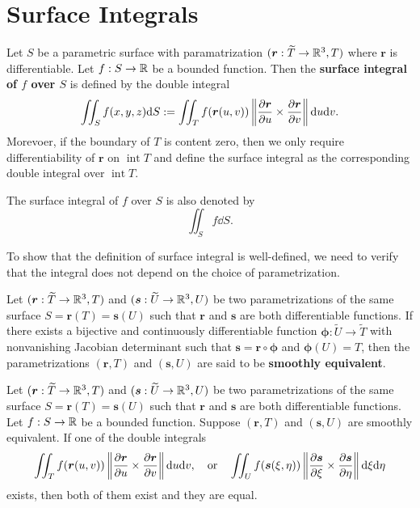 \section{Surface Integrals}
\begin{definitionenv}
    Let $S$ be a parametric surface with paramatrization $(\bm r: \widetilde T\to \mathbb{R}^3, T)$ where $\bm r$ is differentiable. Let $f: S\to \mathbb{R}$ be a bounded function. Then the \textbf{surface integral of $f$ over $S$} is defined by the double integral
    $$ \iint_S f(x,y,z) \dd S := \iint_T f(\bm r(u,v)) \left\| \pdv{\bm r}{u}\times \pdv{\bm r}{v} \right\| \dd u \dd v. $$
    Morevoer, if the boundary of $T$ is content zero, then we only require differentiability of $\bm r$ on $\operatorname{int} T$ and define the surface integral as the corresponding double integral over $\operatorname{int} T$.
\end{definitionenv}
\begin{notationenv}
    The surface integral of $f$ over $S$ is also denoted by
    $$ \iint_S f \dd S. $$
\end{notationenv}
\begin{remarkenv}
    To show that the definition of surface integral is well-defined, we need to verify that the integral does not depend on the choice of parametrization.
\end{remarkenv}
\begin{definitionenv}
    Let $(\bm r: \widetilde T\to \mathbb{R}^3, T)$ and $(\bm s: \widetilde U\to \mathbb{R}^3, U)$ be two parametrizations of the same surface $S = \bm r(T) = \bm s(U)$ such that $\bm r$ and $\bm s$ are both differentiable functions. If there exists a bijective and continuously differentiable function $\bm \phi: \widetilde U\to \widetilde T$ with nonvanishing Jacobian determinant such that $\bm s = \bm r\circ \bm \phi$ and $\bm \phi(U) = T$, then the parametrizations $(\bm r, T)$ and $(\bm s, U)$ are said to be \textbf{smoothly equivalent}.
\end{definitionenv}
\begin{theoremenv}
    Let $(\bm r: \widetilde T\to \mathbb{R}^3, T)$ and $(\bm s: \widetilde U\to \mathbb{R}^3, U)$ be two parametrizations of the same surface $S = \bm r(T) = \bm s(U)$ such that $\bm r$ and $\bm s$ are both differentiable functions. Let $f: S\to \mathbb{R}$ be a bounded function. Suppose $(\bm r, T)$ and $(\bm s, U)$ are smoothly equivalent. If one of the double integrals
    $$ \iint_T f(\bm r(u,v)) \left\| \pdv{\bm r}{u}\times \pdv{\bm r}{v} \right\| \dd u \dd v, \quad \text{or} \quad \iint_U f(\bm s(\xi,\eta)) \left\| \pdv{\bm s}{\xi}\times \pdv{\bm s}{\eta} \right\| \dd \xi \dd \eta $$
    exists, then both of them exist and they are equal.
\end{theoremenv}
